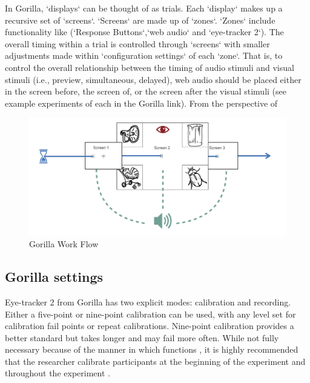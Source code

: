 In Gorilla, `displays` can be thought of as trials. Each `display` makes up a recursive set of `screens`. `Screens` are made up of `zones`. `Zones` include functionality like (`Response Buttons`,`web audio` and `eye-tracker 2`). The overall timing within a trial is controlled through `screens` with smaller adjustments made within `configuration settings` of each `zone`.  That is, to control the overall relationship between the timing of audio stimuli and visual stimuli (i.e., preview, simultaneous, delayed), web audio should be placed either in the screen before, the screen of, or the screen after the visual stimuli (see example experiments of each in the Gorilla link). From the perspective of 

\begin{figure}[h]
    \centering
    \includegraphics[scale=.5]{figures/Gorilla_work_flow.png}
    \caption{Gorilla Work Flow}
    \label{fig:Gorilla_work_flow}
\end{figure}

\subsection{Gorilla settings}

Eye-tracker 2 from Gorilla has two explicit modes: calibration and recording. Either a five-point or nine-point calibration can be used, with any level set for calibration fail points or repeat calibrations. Nine-point calibration provides a better standard but takes longer and may fail more often. While not fully necessary because of the manner in which   functions \parencite[e.g.,][]{ Chen_et_al_2001}, it is highly recommended that the researcher calibrate participants at the beginning of the experiment and throughout the experiment \parencite[][]{Prystauka_Altmann_Rothman_2023}. 

